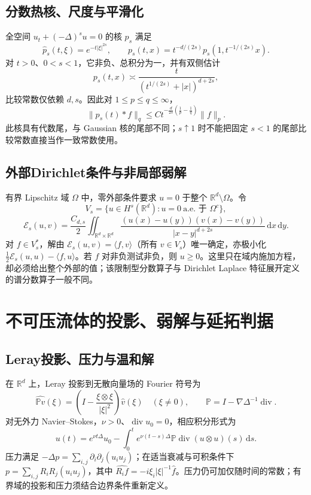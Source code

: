 \documentclass[../main.tex]{subfiles}
\begin{document}
\subsection{分数热核、尺度与平滑化}
全空间 $u_t+(-\Delta)^su=0$ 的核 $p_s$ 满足
\[
\widehat p_s(t,\xi)=e^{-t|\xi|^{2s}},\qquad
p_s(t,x)=t^{-d/(2s)}p_s(1,t^{-1/(2s)}x).
\]
对 $t>0$、$0<s<1$，它非负、总积分为一，并有双侧估计
\[
p_s(t,x)\asymp\frac{t}{(t^{1/(2s)}+|x|)^{d+2s}},
\]
比较常数仅依赖 $d,s$。因此对 $1\le p\le q\le\infty$，
\[
\|p_s(t)*f\|_q\le C t^{-\frac d{2s}(\frac1p-\frac1q)}\|f\|_p.
\]
此核具有代数尾，与 Gaussian 核的尾部不同；$s\uparrow1$ 时不能把固定 $s<1$ 的尾部比较常数直接当作一致常数使用。
\subsection{外部Dirichlet条件与非局部弱解}
有界 Lipschitz 域 $\Omega$ 中，零外部条件要求 $u=0$ 于整个 $\mathbb R^d\setminus\Omega$。令
\[
V_s=\{u\in H^s(\mathbb R^d):u=0\ \text{a.e. 于 }\Omega^c\},
\]
\[
\mathcal E_s(u,v)=\frac{C_{d,s}}2\iint_{\mathbb R^d\times\mathbb R^d}
\frac{(u(x)-u(y))(v(x)-v(y))}{|x-y|^{d+2s}}\,\mathrm dx\,\mathrm dy.
\]
对 $f\in V_s^*$，解由 $\mathcal E_s(u,v)=\langle f,v\rangle$（所有 $v\in V_s$）唯一确定，亦极小化 $\frac12\mathcal E_s(u,u)-\langle f,u\rangle$。若 $f$ 对非负测试非负，则 $u\ge0$。这里只在域内施加方程，却必须给出整个外部的值；该限制型分数算子与 Dirichlet Laplace 特征展开定义的谱分数算子一般不同。

\section{不可压流体的投影、弱解与延拓判据}
\subsection{Leray投影、压力与温和解}
在 $\mathbb R^d$ 上，Leray 投影到无散向量场的 Fourier 符号为
\[
\widehat{\mathbb P v}(\xi)=\left(I-\frac{\xi\otimes\xi}{|\xi|^2}\right)\widehat v(\xi)
\quad(\xi\ne0),\qquad\mathbb P=I-\nabla\Delta^{-1}\operatorname{div}.
\]
对无外力 Navier--Stokes，$\nu>0$、$\operatorname{div}u_0=0$，相应积分形式为
\[
u(t)=e^{\nu t\Delta}u_0-\int_0^te^{\nu(t-s)\Delta}
\mathbb P\operatorname{div}(u\otimes u)(s)\,\mathrm ds.
\]
压力满足 $-\Delta p=\sum_{i,j}\partial_i\partial_j(u_i u_j)$；在适当衰减与可积条件下 $p=\sum_{i,j}R_iR_j(u_i u_j)$，其中 $\widehat{R_if}=-i\xi_i|\xi|^{-1}\widehat f$。压力仍可加仅随时间的常数；有界域的投影和压力须结合边界条件重新定义。
\end{document}
